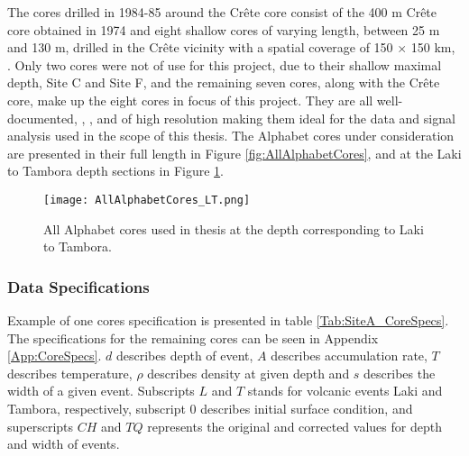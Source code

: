 \documentclass[../../CompleteThesis2/Complete_2ndDraft]{subfiles}
\begin{document}
The cores drilled in 1984-85 around the Crête core consist of the 400 m Crête core obtained in 1974 \cite{bibid} and eight shallow cores of varying length, between 25 m and 130 m, drilled in the Crête vicinity with a spatial coverage of 150 $\times$ 150 km, \cite[Clausen, Gundestrup, Johnsen 1988]{Clausen1988}.
Only two cores were not of use for this project, due to their shallow maximal depth, Site C and Site F, and the remaining seven cores, along with the Crête core, make up the eight cores in focus of this project. They are all well-documented, \cite[Clausen \& Hammer, 1988]{ClausenHammer1988}, \cite[Clausen, Gundestrup, Johnsen 1988]{Clausen1988}, and of high resolution making them ideal for the data and signal analysis used in the scope of this thesis. The Alphabet cores under consideration are presented in their full length in Figure \ref{fig:AllAlphabetCores}, and at the Laki to Tambora depth sections in Figure \ref{fig:AllAlphabetCores_LT}.


\begin{figure}[h]
	\centering
	\texttt{[image: AllAlphabetCores\_LT.png]}
	\caption[All Alphabet core $\delta^{18}$O profiles, depths from Laki to Tambora.]{\small All Alphabet cores used in thesis at the depth corresponding to Laki to Tambora.}
	\label{fig:AllAlphabetCores_LT}
\end{figure}



\subsubsection[Data Specifications][Data Specifications]{Data Specifications}
\label{Subsubsec:Data_Selection_Alhabet_Specifications}



Example of one cores specification is presented in table \ref{Tab:SiteA_CoreSpecs}. The specifications for the remaining cores can be seen in Appendix \ref{App:CoreSpecs}. 
$d$ describes depth of event, $A$ describes accumulation rate, $T$ describes temperature, $\rho$ describes density at given depth and $s$ describes the width of a given event. Subscripts $L$ and $T$ stands for volcanic events Laki and Tambora, respectively, subscript $0$ describes initial surface condition, and superscripts $CH$ and $TQ$ represents the original and corrected values for depth and width of events.
\end{document}
